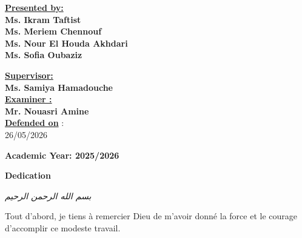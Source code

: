 \documentclass[12pt,a4paper]{report}
\begin{document}
\begin{titlepage}
\vspace{1.5cm}

\begin{minipage}[t]{0.45\textwidth}
    \textbf{\underline{Presented by:}} \\[10pt]
    \textbf{Ms. Ikram Taftist} \\[8pt]
    \textbf{Ms. Meriem Chennouf} \\[8pt]
    \textbf{Ms. Nour El Houda Akhdari} \\[8pt]
    \textbf{Ms. Sofia Oubaziz}
\end{minipage}
\hfill
\begin{minipage}[t]{0.45\textwidth}
    \textbf{\underline{Supervisor:}} \\[8pt]
    \textbf{Ms. Samiya Hamadouche} \\[12pt]
    \textbf{\underline{Examiner :}} \\[8pt]
    \textbf{Mr. Nouasri Amine} \\[12pt]
    \textbf{\underline{Defended on}} : \\[6pt]
    26/05/2026
\end{minipage}

\vspace{\fill}

\begin{center}
    \textbf{Academic Year: 2025/2026}
\end{center}

\end{titlepage}

\clearpage
\thispagestyle{empty}
\null
\newpage

\newpage
\thispagestyle{fancy}
\begin{center}
    {\Large \textbf{Dedication}}
\end{center}

\vspace{0.5cm}

\begin{center}
    \textit{بسم الله الرحمن الرحيم}
\end{center}

\vspace{0.5cm}

Tout d'abord, je tiens à remercier Dieu de m'avoir donné la force et le courage d'accomplir ce modeste travail.

\vspace{0.5cm}
\end{document}
